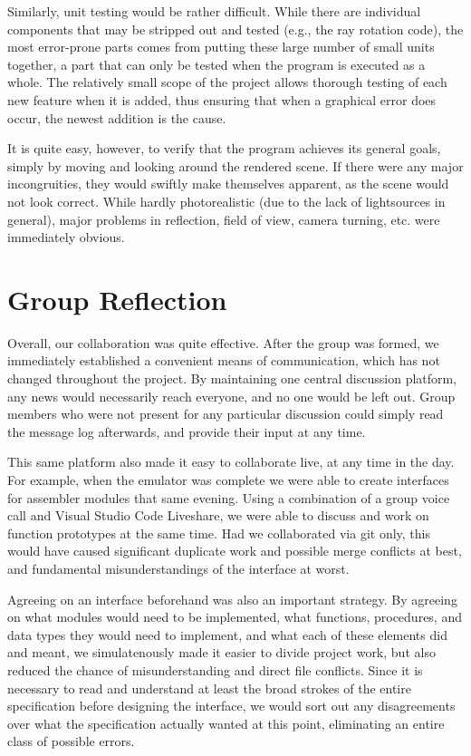 \documentclass[11pt]{article}
\begin{document}
Similarly, unit testing would be rather difficult. While there are individual components that may be stripped out and tested (e.g., the ray rotation code), the most error-prone parts comes from putting these large number of small units together, a part that can only be tested when the program is executed as a whole. The relatively small scope of the project allows thorough testing of each new feature when it is added, thus ensuring that when a graphical error does occur, the newest addition is the cause.

It is quite easy, however, to verify that the program achieves its general goals, simply by moving and looking around the rendered scene. If there were any major incongruities, they would swiftly make themselves apparent, as the scene would not look correct. While hardly photorealistic (due to the lack of lightsources in general), major problems in reflection, field of view, camera turning, etc. were immediately obvious.

\section{Group Reflection}

Overall, our collaboration was quite effective. After the group was formed, we immediately established a convenient means of communication, which has not changed throughout the project. By maintaining one central discussion platform, any news would necessarily reach everyone, and no one would be left out. Group members who were not present for any particular discussion could simply read the message log afterwards, and provide their input at any time.

This same platform also made it easy to collaborate live, at any time in the day. For example, when the emulator was complete we were able to create interfaces for assembler modules that same evening. Using a combination of a group voice call and Visual Studio Code Liveshare, we were able to discuss and work on function prototypes at the same time. Had we collaborated via git only, this would have caused significant duplicate work and possible merge conflicts at best, and fundamental misunderstandings of the interface at worst.

Agreeing on an interface beforehand was also an important strategy. By agreeing on what modules would need to be implemented, what functions, procedures, and data types they would need to implement, and what each of these elements did and meant, we simulatenously made it easier to divide project work, but also reduced the chance of misunderstanding and direct file conflicts. Since it is necessary to read and understand at least the broad strokes of the entire specification before designing the interface, we would sort out any disagreements over what the specification actually wanted at this point, eliminating an entire class of possible errors.
\end{document}
